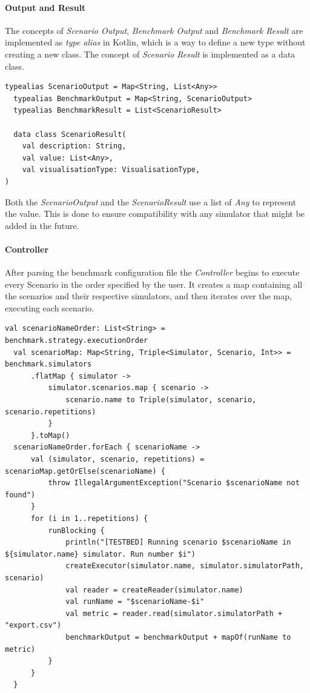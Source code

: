 \documentclass[12pt,a4paper,openright,twoside]{book}
\begin{document}
\paragraph*{Output and Result}

The concepts of \emph{Scenario Output}, \emph{Benchmark Output} and \emph{Benchmark Result} are implemented as \emph{type alias} in Kotlin, which is a way to define a new type without creating a new class.
The concept of \emph{Scenario Result} is implemented as a data class.

\begin{lstlisting}[language=my-kotlin, caption={Benchmark output and result model}]
  typealias ScenarioOutput = Map<String, List<Any>>
  typealias BenchmarkOutput = Map<String, ScenarioOutput>
  typealias BenchmarkResult = List<ScenarioResult>

  data class ScenarioResult(
    val description: String,
    val value: List<Any>,
    val visualisationType: VisualisationType,
)
\end{lstlisting}

Both the \textit{ScenarioOutput} and the \textit{ScenarioResult} use a list of \emph{Any} to represent the value.
This is done to ensure compatibility with any simulator that might be added in the future.

\paragraph*{Controller}

After parsing the benchmark configuration file the \emph{Controller} begins to execute every Scenario in the order specified by the user.
It creates a map containing all the scenarios and their respective simulators, and then iterates over the map, executing each scenario.

\begin{lstlisting}[language=my-kotlin, caption={Controller implementation}]
  val scenarioNameOrder: List<String> = benchmark.strategy.executionOrder
  val scenarioMap: Map<String, Triple<Simulator, Scenario, Int>> = benchmark.simulators
      .flatMap { simulator ->
          simulator.scenarios.map { scenario ->
              scenario.name to Triple(simulator, scenario, scenario.repetitions)
          }
      }.toMap()
  scenarioNameOrder.forEach { scenarioName ->
      val (simulator, scenario, repetitions) = scenarioMap.getOrElse(scenarioName) {
          throw IllegalArgumentException("Scenario $scenarioName not found")
      }
      for (i in 1..repetitions) {
          runBlocking {
              println("[TESTBED] Running scenario $scenarioName in ${simulator.name} simulator. Run number $i")
              createExecutor(simulator.name, simulator.simulatorPath, scenario)
              val reader = createReader(simulator.name)
              val runName = "$scenarioName-$i"
              val metric = reader.read(simulator.simulatorPath + "export.csv")
              benchmarkOutput = benchmarkOutput + mapOf(runName to metric)
          }
      }
  }
\end{lstlisting}
\end{document}
